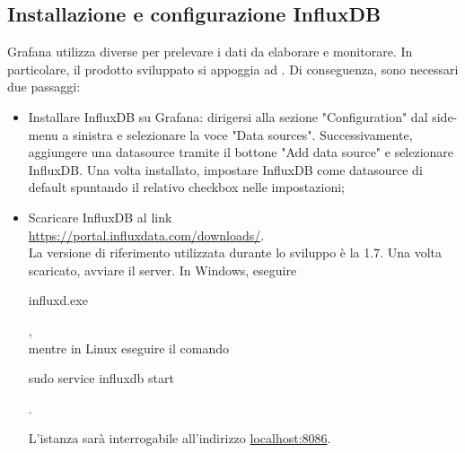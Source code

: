 \subsection{Installazione e configurazione InfluxDB}
Grafana utilizza diverse  per prelevare i dati da elaborare e monitorare. In particolare, il prodotto sviluppato si appoggia ad .
Di conseguenza, sono necessari due passaggi:
\begin{itemize}
	\item{Installare InfluxDB su Grafana:  dirigersi alla sezione "Configuration" dal side-menu a sinistra e selezionare la voce "Data sources". Successivamente, aggiungere una datasource tramite il bottone "Add data source" e selezionare InfluxDB. Una volta installato, impostare InfluxDB come datasource di default spuntando il relativo checkbox nelle impostazioni;}
	\item{Scaricare InfluxDB al link \\[0.2cm]
		\hspace*{10mm}\url{https://portal.influxdata.com/downloads/}.\\[0.2cm] La versione di riferimento utilizzata durante lo sviluppo è la 1.7. Una volta scaricato, avviare il server. In Windows, eseguire \\[0.2cm]
		\hspace*{10mm}\begin{ttfamily}influxd.exe\end{ttfamily},\\[0.2cm] mentre in Linux eseguire il comando \begin{ttfamily}sudo service influxdb start\end{ttfamily}.\\}
	L'istanza sarà interrogabile all'indirizzo \url{localhost:8086}.
\end{itemize}

\pagebreak